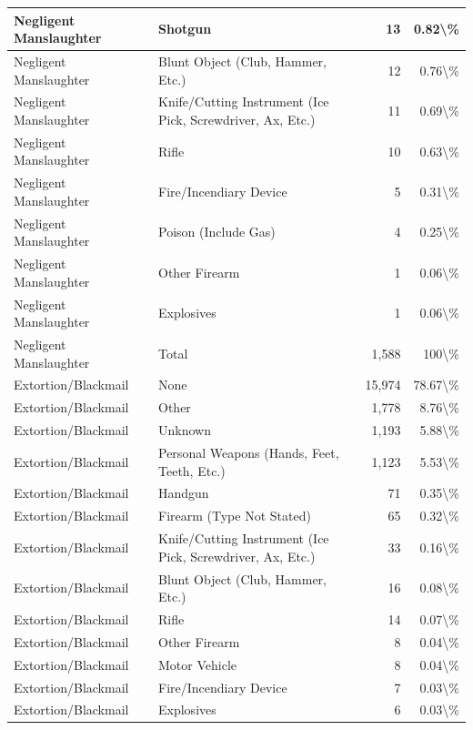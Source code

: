 \documentclass[
]{krantz}
\begin{document}
\begin{longtable}[t]{l|l|r|r}
\hline
Negligent Manslaughter & Shotgun & 13 & 0.82\textbackslash{}\%\\
\hline
Negligent Manslaughter & Blunt Object (Club, Hammer, Etc.) & 12 & 0.76\textbackslash{}\%\\
\hline
Negligent Manslaughter & Knife/Cutting Instrument (Ice Pick, Screwdriver, Ax, Etc.) & 11 & 0.69\textbackslash{}\%\\
\hline
Negligent Manslaughter & Rifle & 10 & 0.63\textbackslash{}\%\\
\hline
Negligent Manslaughter & Fire/Incendiary Device & 5 & 0.31\textbackslash{}\%\\
\hline
Negligent Manslaughter & Poison (Include Gas) & 4 & 0.25\textbackslash{}\%\\
\hline
Negligent Manslaughter & Other Firearm & 1 & 0.06\textbackslash{}\%\\
\hline
Negligent Manslaughter & Explosives & 1 & 0.06\textbackslash{}\%\\
\hline
Negligent Manslaughter & Total & 1,588 & 100\textbackslash{}\%\\
\hline
Extortion/Blackmail & None & 15,974 & 78.67\textbackslash{}\%\\
\hline
Extortion/Blackmail & Other & 1,778 & 8.76\textbackslash{}\%\\
\hline
Extortion/Blackmail & Unknown & 1,193 & 5.88\textbackslash{}\%\\
\hline
Extortion/Blackmail & Personal Weapons (Hands, Feet, Teeth, Etc.) & 1,123 & 5.53\textbackslash{}\%\\
\hline
Extortion/Blackmail & Handgun & 71 & 0.35\textbackslash{}\%\\
\hline
Extortion/Blackmail & Firearm (Type Not Stated) & 65 & 0.32\textbackslash{}\%\\
\hline
Extortion/Blackmail & Knife/Cutting Instrument (Ice Pick, Screwdriver, Ax, Etc.) & 33 & 0.16\textbackslash{}\%\\
\hline
Extortion/Blackmail & Blunt Object (Club, Hammer, Etc.) & 16 & 0.08\textbackslash{}\%\\
\hline
Extortion/Blackmail & Rifle & 14 & 0.07\textbackslash{}\%\\
\hline
Extortion/Blackmail & Other Firearm & 8 & 0.04\textbackslash{}\%\\
\hline
Extortion/Blackmail & Motor Vehicle & 8 & 0.04\textbackslash{}\%\\
\hline
Extortion/Blackmail & Fire/Incendiary Device & 7 & 0.03\textbackslash{}\%\\
\hline
Extortion/Blackmail & Explosives & 6 & 0.03\textbackslash{}\%\\

\end{longtable}
\end{document}
